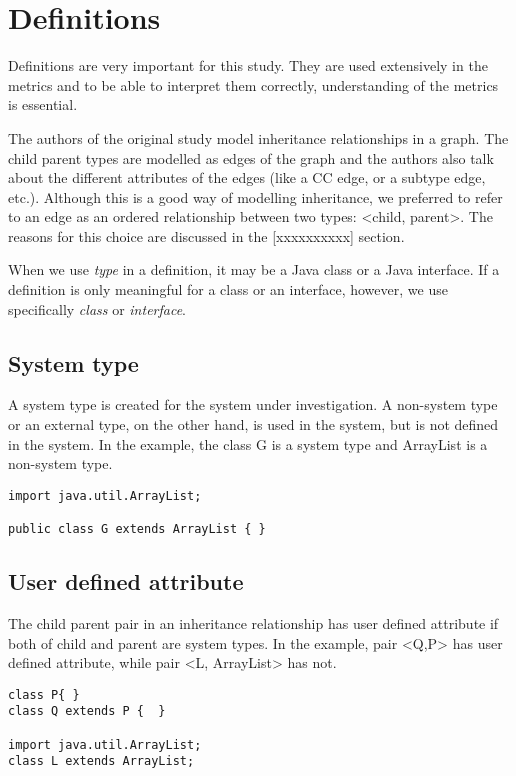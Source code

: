 \documentclass{uvamscse}
\begin{document}
\chapter{Definitions}
Definitions are very important for this study. They are used extensively in the metrics and to be able to interpret them correctly, understanding of the metrics is essential. 

The authors of the original study model inheritance relationships in a graph. The child parent types are modelled as edges of the graph and the authors also talk about the different attributes of the edges (like a CC edge, or a subtype edge, etc.). Although this is a good way of modelling inheritance, we preferred to refer to an edge as an ordered relationship between two types: <child, parent>. The reasons for this choice are discussed in the [xxxxxxxxxx] section.

When we use \emph{type} in a definition, it may be a Java class or a Java interface.  If a definition is only meaningful for a class or an interface, however, we use specifically \emph{class} or \emph{interface}.


\section{System type}
\begin{multicols}{2}
A system type is created for the system under investigation. A non-system type or an external type, on the other hand, is used in the system, but is not defined in the system. In the example, the class G is a system type and ArrayList is a non-system type.
\columnbreak
\begin{verbatim}
import java.util.ArrayList;  
    
public class G extends ArrayList { }
\end{verbatim}
\end{multicols}


\section{User defined attribute}
\begin{multicols}{2}
The child parent pair in an inheritance relationship has user defined attribute if both of child and parent are system types. In the example, pair <Q,P> has user defined attribute, while pair <L, ArrayList> has not.
\columnbreak
\begin{verbatim}
class P{ }
class Q extends P {  }
   
import java.util.ArrayList;
class L extends ArrayList;
\end{verbatim}
\end{multicols}
\end{document}
